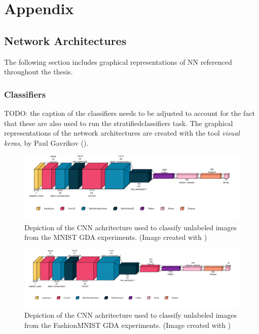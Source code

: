 \section*{Appendix}\label{appendix}

\setcounter{page}{1}

\subsection{Network Architectures}
The following section includes graphical representations of NN referenced throughout the thesis. %

\subsubsection{Classifiers}\label{appendix_classifiers}
TODO: the caption of the classifiers needs to be adjusted to account for the fact that these are also used to run the stratifiedclassifiers task. 
The graphical representations of the network architectures are created with the tool \textit{visual keras}, by Paul Gavrikov (\cite{Gavrikov2020VisualKeras}).

\begin{figure}[htbp]
    \centering
    \vspace{-.5em}
    \includegraphics[width=.9\textwidth]{abb/netron_network_archs/classifying_Classifier_MNIST.png}
    \caption{Depiction of the CNN achritecture used to classify unlabeled images from the MNIST GDA experiments. (Image created with \cite{Gavrikov2020VisualKeras})}
    \label{fig:figure_class_mnist}
\end{figure}

\begin{figure}[htbp]
    \centering
    \vspace{-2em}
    \includegraphics[width=.9\textwidth]{abb/netron_network_archs/classifying_Classifier_FashionMNIST.png}
    \caption{Depiction of the CNN achritecture used to classify unlabeled images from the FashionMNIST GDA experiments. (Image created with \cite{Gavrikov2020VisualKeras})}
    \label{fig:figure_class_fashion}
\end{figure}

